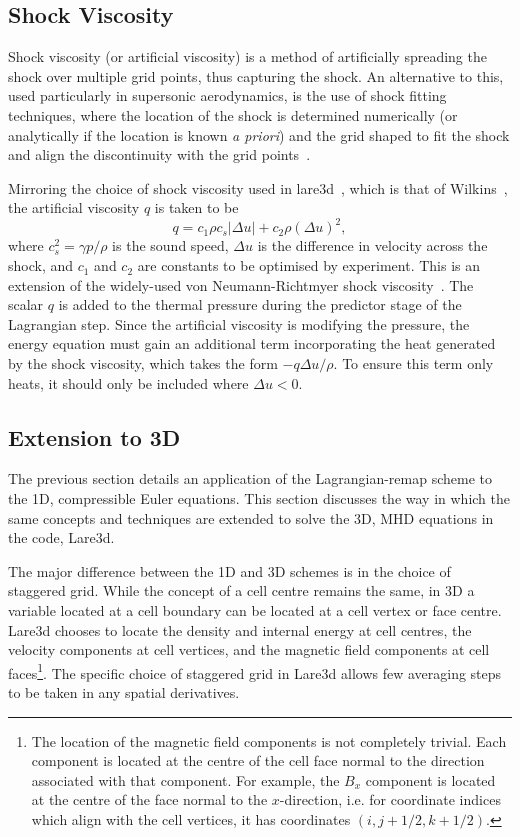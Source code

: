 \subsection{Shock Viscosity}

Shock viscosity (or artificial viscosity) is a method of artificially spreading the shock over multiple grid points, thus capturing the shock. An alternative to this, used particularly in supersonic aerodynamics, is the use of shock fitting techniques, where the location of the shock is determined numerically (or analytically if the location is known \emph{a priori}) and the grid shaped to fit the shock and align the discontinuity with the grid points~\cite{paciorriShockfittingTechnique2D2009}.

Mirroring the choice of shock viscosity used in lare3d~\cite{arberStaggeredGridLagrangian2001}, which is that of Wilkins~\cite{wilkinsUseArtificialViscosity1980a}, the artificial viscosity $q$ is taken to be
\begin{equation}
  \label{eq:artificial_viscosity}
q = c_1 \rho c_s | \Delta u | + c_2 \rho (\Delta u)^2,
\end{equation}
where $c_s^2 = \gamma p / \rho$ is the sound speed, $\Delta u$ is the difference in velocity across the shock, and $c_1$ and $c_2$ are constants to be optimised by experiment. This is an extension of the widely-used von Neumann-Richtmyer shock viscosity~\cite{vonneumannMethodNumericalCalculation1950}. The scalar $q$ is added to the thermal pressure during the predictor stage of the Lagrangian step. Since the artificial viscosity is modifying the pressure, the energy equation must gain an additional term incorporating the heat generated by the shock viscosity, which takes the form $-q\Delta u/\rho$. To ensure this term only heats, it should only be included where $\Delta u < 0$. 


\subsection{Extension to 3D}

The previous section details an application of the Lagrangian-remap scheme to the 1D, compressible Euler equations. This section discusses the way in which the same concepts and techniques are extended to solve the 3D, MHD equations in the code, Lare3d.

The major difference between the 1D and 3D schemes is in the choice of staggered grid. While the concept of a cell centre remains the same, in 3D a variable located at a cell boundary can be located at a cell vertex or face centre. Lare3d chooses to locate the density and internal energy at cell centres, the velocity components at cell vertices, and the magnetic field components at cell faces\footnote{The location of the magnetic field components is not completely trivial. Each component is located at the centre of the cell face normal to the direction associated with that component. For example, the $B_x$ component is located at the centre of the face normal to the $x$-direction, i.e. for coordinate indices which align with the cell vertices, it has coordinates $(i, j+1/2, k+1/2)$.}. The specific choice of staggered grid in Lare3d allows few averaging steps to be taken in any spatial derivatives.

